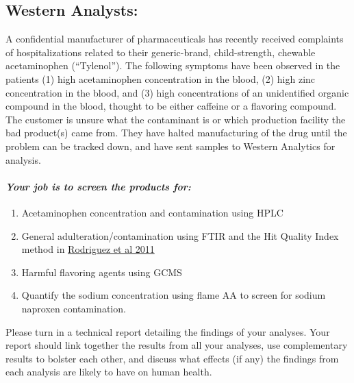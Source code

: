 \documentclass[]{tufte-book}
\providecommand{\tightlist}{%
  \setlength{\itemsep}{0pt}\setlength{\parskip}{0pt}}
\begin{document}
\hypertarget{western-analysts-1}{%
\subsection*{Western Analysts:}\label{western-analysts-1}}

A confidential manufacturer of pharmaceuticals has recently received complaints of hospitalizations related to their generic-brand, child-strength, chewable acetaminophen (``Tylenol''). The following symptoms have been observed in the patients (1) high acetaminophen concentration in the blood, (2) high zinc concentration in the blood, and (3) high concentrations of an unidentified organic compound in the blood, thought to be either caffeine or a flavoring compound. The customer is unsure what the contaminant is or which production facility the bad product(s) came from. They have halted manufacturing of the drug until the problem can be tracked down, and have sent samples to Western Analytics for analysis.

\hypertarget{your-job-is-to-screen-the-products-for-1}{%
\paragraph{\texorpdfstring{\emph{Your job is to screen the products for:}}{Your job is to screen the products for:}}\label{your-job-is-to-screen-the-products-for-1}}

\begin{enumerate}
\def\labelenumi{\arabic{enumi}.}
\tightlist
\item
  Acetaminophen concentration and contamination using HPLC
\item
  General adulteration/contamination using FTIR and the Hit Quality Index method in \href{https://www.researchgate.net/profile/John_Clarkson6/post/What_are_some_good_reference_bands_for_Raman_spectroscopy/attachment/59d6244c79197b8077982a27/AS\%3A312109580128257\%401451424130311/download/Standardization+of+Raman+spectra+for+transfer+of+spectral+libraries+across+different+instruments.pdf}{Rodriguez et al 2011}
\item
  Harmful flavoring agents using GCMS
\item
  Quantify the sodium concentration using flame AA to screen for sodium naproxen contamination.
\end{enumerate}

Please turn in a technical report detailing the findings of your analyses. Your report should link together the results from all your analyses, use complementary results to bolster each other, and discuss what effects (if any) the findings from each analysis are likely to have on human health.
\end{document}
